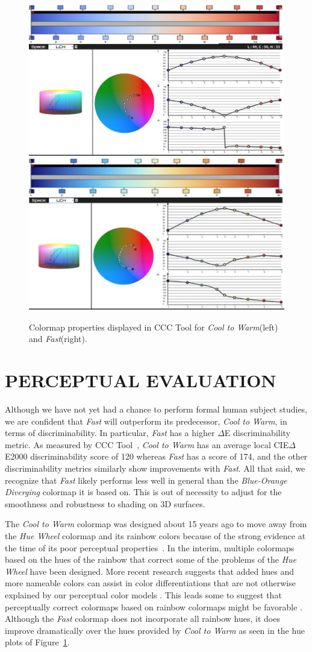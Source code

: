 \documentclass{IEEEcsmag}
\newcommand*{\colormap}[1]{\textsl{#1}\xspace}
\newcommand*{\huewheel}{\colormap{Hue Wheel}}
\newcommand*{\coolwarm}{\colormap{Cool to Warm}}
\newcommand*{\blueorange}{\colormap{Blue-Orange Diverging}}
\newcommand*{\fast}{\colormap{Fast}}
\begin{document}
\begin{figure}[htb]
  \centering
  \includegraphics[width=.49\textwidth]{Final_Pics/chart_CW.png}
  \includegraphics[width=.49\textwidth]{Final_Pics/chart_Fast.png}
  \caption{Colormap properties displayed in CCC Tool \cite{Nardini2021} for \coolwarm (left) and \fast (right).}
  \label{Charts}
\end{figure}


\section{PERCEPTUAL EVALUATION}

Although we have not yet had a chance to perform formal human subject studies, we are confident that \fast will outperform its predecessor, \coolwarm, in terms of discriminability.
In particular, \fast has a higher $\Delta$E discriminability metric.
As measured by CCC Tool~\cite{Nardini2021}, \coolwarm has an average local CIE$\Delta$E2000 discriminability score of 120 whereas \fast has a score of 174, and the other discriminability metrics similarly show improvements with \fast.
All that said, we recognize that \fast%
likely performs less well in general than the \blueorange colormap it is based on.
This is out of necessity to adjust for the smoothness and robustness to shading on 3D surfaces.

The \coolwarm colormap was designed about 15 years ago to move away from the \huewheel colormap and its rainbow colors because of the strong evidence at the time of its poor perceptual properties~\cite{Rogowitz1998,Borland2007,Ware1988,Light2004}.
In the interim, multiple colormaps based on the hues of the rainbow that correct some of the problems of the \huewheel have been designed.
More recent research suggests that added hues and more nameable colors can assist in color differentiations that are not otherwise explained by our perceptual color models \cite{Reda2021}.
This leads some to suggest that perceptually correct colormaps based on rainbow colormaps might be favorable \cite{Ware2023}.
Although the \fast colormap does not incorporate all rainbow hues, it does improve dramatically over the hues provided by \coolwarm as seen in the hue plots of Figure~\ref{Charts}.
\end{document}

